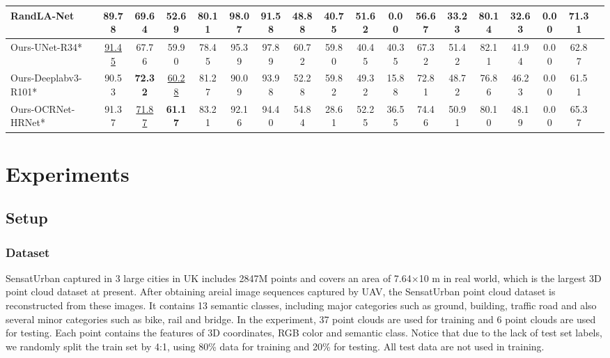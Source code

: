 \documentclass[conference]{IEEEtran}
\begin{document}
\begin{table*}[htp!]
\begin{tabular}{lccccccccccccccccc}
RandLA-Net\cite{Hu2020RandLANetES}         & 89.78  & 69.64    & 52.69    & 80.11  & 98.07  & 91.58    & 48.88  & 40.75  & 51.62   & 0.00   & 56.67    & 33.23   & 80.14  & 32.63    & 0.00   & 71.31   \\ \hline
Ours-UNet-R34*  &  \underline{91.45} & 67.76 & 59.90 & 78.45 & 95.39 & 97.89 & 60.72 & 59.80 & 40.45 & 40.35 & 67.32 & 51.42 & 82.11 & 41.94 & 0.00 & 62.87 \\ 
Ours-Deeplabv3-R101* & 90.53 & \multicolumn{1}{c}{\textbf{72.32}} & \underline{60.28} & \multicolumn{1}{c}{81.27} & \multicolumn{1}{c}{90.09} & \multicolumn{1}{c}{93.98} & \multicolumn{1}{c}{52.28} & \multicolumn{1}{c}{59.82} & \multicolumn{1}{c}{49.32} & \multicolumn{1}{c}{15.88} & \multicolumn{1}{c}{72.81} & \multicolumn{1}{c}{48.72} & \multicolumn{1}{c}{76.86} & \multicolumn{1}{c}{46.23} & \multicolumn{1}{c}{0.00} & \multicolumn{1}{c}{61.51} \\ 
Ours-OCRNet-HRNet*       & 91.37      & \multicolumn{1}{c}{\underline{71.87}} & \textbf{61.17} & \multicolumn{1}{c}{83.21} & \multicolumn{1}{c}{92.16} & \multicolumn{1}{c}{94.40} & \multicolumn{1}{c}{54.84} & \multicolumn{1}{c}{28.61} & \multicolumn{1}{c}{52.25} & \multicolumn{1}{c}{36.55} & \multicolumn{1}{c}{74.46} & \multicolumn{1}{c}{50.91} & \multicolumn{1}{c}{80.10} & \multicolumn{1}{c}{48.19} & \multicolumn{1}{c}{0.00} & \multicolumn{1}{c}{65.37} \\ \hline
\end{tabular}
\label{Result}
\end{table*}



\section{Experiments}

\subsection{Setup}
\subsubsection{Dataset}
SensatUrban \cite{Hu2020TowardsSS} captured in 3 large cities in UK  includes 2847M points and covers an area of 7.64×10 m in real world, which is the largest 3D point cloud dataset at present. 
After obtaining areial image sequences captured by UAV, the SensatUrban point cloud dataset is reconstructed from these images. It contains 13 semantic classes, including major categories such as ground, building, traffic road and also several minor categories such as bike, rail and bridge. 
In the experiment, 37 point clouds are used for training and 6 point clouds are used for testing. Each point contains the features of 3D coordinates, RGB color and semantic class. Notice that due to the lack of test set labels, we randomly split the train set by 4:1, using 80\% data for training and 20\% for testing. All test data are not used in training.
\end{document}
